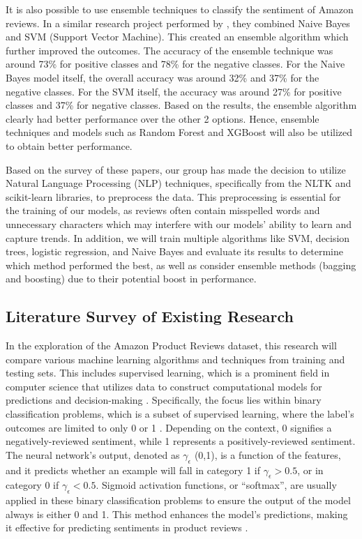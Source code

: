 \documentclass[stu,12pt,floatsintext]{apa7}
\begin{document}
It is also possible to use ensemble techniques to classify the sentiment of Amazon reviews. In a similar research project performed by \textcite{sadhasivam2019sentiment}, they combined Naive Bayes and SVM (Support Vector Machine). This created an ensemble algorithm which further improved the outcomes. The accuracy of the ensemble technique was around 73\% for positive classes and 78\% for the negative classes. For the Naive Bayes model itself, the overall accuracy was around 32\% and 37\% for the negative classes. For the SVM itself, the accuracy was around 27\% for positive classes and 37\% for negative classes. Based on the results, the ensemble algorithm clearly had better performance over the other 2 options. Hence, ensemble techniques and models such as Random Forest and XGBoost will also be utilized to obtain better performance. 

Based on the survey of these papers, our group has made the decision to utilize Natural Language Processing (NLP) techniques, specifically from the NLTK and scikit-learn libraries, to preprocess the data. This preprocessing is essential for the training of our models, as reviews often contain misspelled words and unnecessary characters which may interfere with our models’ ability to learn and capture trends. In addition, we will train multiple algorithms like SVM, decision trees, logistic regression, and Naive Bayes and evaluate its results to determine which method performed the best, as well as consider ensemble methods (bagging and boosting) due to their potential boost in performance.


\subsection{Literature Survey of Existing Research}
In the exploration of the Amazon Product Reviews dataset, this research will compare various machine learning algorithms and techniques from training and testing sets. This includes supervised learning, which is a prominent field in computer science that utilizes data to construct computational models for predictions and decision-making \parencite{saridena2023sentiment}. Specifically, the focus lies within binary classification problems, which is a subset of supervised learning, where the label's outcomes are limited to only 0 or 1 \parencite{saridena2023sentiment}. Depending on the context, 0 signifies a negatively-reviewed sentiment, while 1 represents a positively-reviewed sentiment. The neural network's output, denoted as $\gamma_\epsilon$ (0,1), is a function of the features, and it predicts whether an example will fall in category 1 if $\gamma_\epsilon > 0.5$, or in category 0 if $\gamma_\epsilon < 0.5$. Sigmoid activation functions, or ``softmax'', are usually applied in these binary classification problems to ensure the output of the model always is either 0 and 1. This method enhances the model's predictions, making it effective for predicting sentiments in product reviews \parencite{saridena2023sentiment}.
\end{document}
